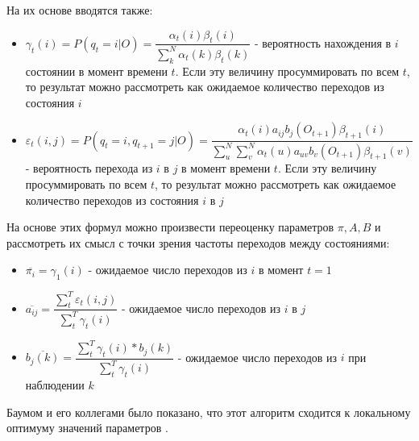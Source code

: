 На их основе вводятся также:
\begin{itemize}
\item $\gamma_t(i)=P(q_t=i | O)=\dfrac{\alpha_t(i)\beta_t(i)}{\sum\limits_k^N\alpha_t(k)\beta_t(k)}$ - вероятность нахождения в $i$ состоянии в момент времени $t$. Если эту величину просуммировать по всем $t$, то результат можно рассмотреть как ожидаемое количество переходов из состояния $i$
\item $\varepsilon_t(i,j)=P(q_t=i, q_{t+1}=j | O)=\dfrac{\alpha_t(i)a_{ij}b_j(O_{t+1})\beta_{t+1}(i)}{\sum\limits_u^N\sum\limits_v^N\alpha_t(u)a_{uv}b_v(O_{t+1})\beta_{t+1}(v)}$ - вероятность перехода из $i$ в $j$ в момент времени $t$. Если эту величину просуммировать по всем $t$, то результат можно рассмотреть как ожидаемое количество переходов из состояния $i$ в $j$
\end{itemize}

На основе этих формул можно произвести переоценку параметров $\pi, A, B$ и рассмотреть их смысл с точки зрения частоты переходов между состояниями:

\begin{itemize}
\item $\overline{\pi_i}=\gamma_1(i)$ - ожидаемое число переходов из $i$ в момент $t=1$
\item $\overline{a_{ij}}=\dfrac{\sum\limits_t^T\varepsilon_t(i,j)}{\sum\limits_t^T\gamma_t(i)}$ - ожидаемое число переходов из $i$ в $j$
\item $\overline{b_{j}(k)}=\dfrac{\sum\limits_t^T\gamma_t(i)*b_j(k)}{\sum\limits_t^T\gamma_t(i)}$ - ожидаемое число переходов из $i$ при наблюдении $k$
\end{itemize}

Баумом и его коллегами было показано, что этот алгоритм сходится к локальному оптимуму значений параметров \cite{hmm_conv_proof}.
